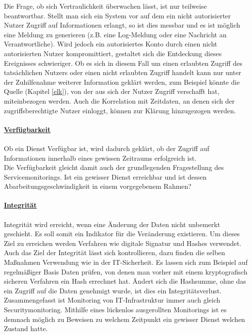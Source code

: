 Die Frage, ob sich Vertraulichkeit überwachen lässt, ist nur teilweise beantwortbar.
Stellt man sich ein System vor auf dem ein nicht autorisierter Nutzer Zugriff auf
Informationen erlangt, so ist dies messbar und es ist möglich eine Meldung 
zu generieren (z.B. eine Log-Meldung oder eine Nachricht an Verantwortliche). Wird 
jedoch ein autorisiertes Konto durch einen nicht autorisierten Nutzer kompromittiert,
gestaltet sich die Entdeckung dieses Ereignisses schwieriger. Ob es sich in diesem Fall 
um einen erlaubten Zugriff des tatsächlichen Nutzers oder einen nicht erlaubten Zugriff
handelt kann nur unter der Zuhilfenahme weiterer Information geklärt werden,
zum Beispiel könnte die Quelle (Kapitel \ref{elk}), von der aus sich der Nutzer Zugriff 
verschafft hat,
miteinbezogen werden. Auch die Korrelation mit Zeitdaten, an denen sich der 
zugriffsberechtigte Nutzer einloggt, können zur Klärung hinzugezogen werden.\\\\

\underline{\textbf{Verfügbarkeit}}\\\\
Ob ein Dienst Verfügbar ist, wird dadurch geklärt, ob der Zugriff auf Informationen
innerhalb eines gewissen Zeitraums erfolgreich ist.\\

Die Verfügbarkeit gleicht damit auch der grundlegenden Fragestellung des 
Servicemonitorings. Ist ein gewisser Dienst erreichbar und ist dessen 
Abarbeitungsgeschwindigkeit in einem vorgegebenem Rahmen?\\\\
\newpage
\underline{\textbf{Integrität}}\\\\
Integrität wird erreicht, wenn eine Änderung der Daten nicht unbemerkt geschieht. Es soll 
somit ein Indikator für die Veränderung existieren. Um dieses Ziel zu erreichen werden
Verfahren wie digitale Signatur und Hashes verwendet.\\

Auch das Ziel der Integrität lässt sich kontrollieren, dazu finden die selben Maßnahmen 
Verwendung wie in der IT-Sicherheit. Es lassen sich zum Beispiel auf regelmäßiger Basis 
Daten prüfen, von denen man vorher mit einem kryptografisch sicheren Verfahren ein Hash 
errechnet hat. Ändert sich die Hashsumme, ohne das ein Zugriff auf die Daten genehmigt 
wurde, ist dies ein Integritätsverlust.\\

Zusammengefasst ist Monitoring von IT-Infrastruktur immer auch gleich Securitymonitoring. 
Mithilfe eines lückenlos ausgerollten Monitorings ist es demnach möglich zu Beweisen zu 
welchem Zeitpunkt ein gewisser Dienst welchen Zustand hatte.
 
